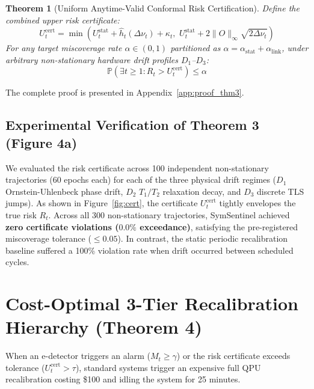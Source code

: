 \documentclass[aps,pra,twocolumn,superscriptaddress,10pt,floatfix]{revtex4-2}
\newtheorem{theorem}{Theorem}
\begin{document}
\begin{theorem}[Uniform Anytime-Valid Conformal Risk Certification]
\label{thm:certify}
Define the combined upper risk certificate:
\begin{equation}
U_t^{\mathrm{cert}} = \min\left( U_t^{\mathrm{stat}} + \hat{h}_t(\Delta \nu_t) + \kappa_t, \,\, U_t^{\mathrm{stat}} + 2 \|O\|_\infty \sqrt{2 \Delta \nu_t} \right)
\label{eq:combined_cert}
\end{equation}
For any target miscoverage rate $\alpha \in (0, 1)$ partitioned as $\alpha = \alpha_{\mathrm{stat}} + \alpha_{\mathrm{link}}$, under arbitrary non-stationary hardware drift profiles $D_1$--$D_3$:
\begin{equation}
\mathbb{P}\left( \exists t \ge 1 : R_t > U_t^{\mathrm{cert}} \right) \le \alpha
\end{equation}
\end{theorem}
The complete proof is presented in Appendix~\ref{app:proof_thm3}.

\subsection{Experimental Verification of Theorem 3 (Figure 4a)}
We evaluated the risk certificate across 100 independent non-stationary trajectories (60 epochs each) for each of the three physical drift regimes ($D_1$ Ornstein-Uhlenbeck phase drift, $D_2$ $T_1/T_2$ relaxation decay, and $D_3$ discrete TLS jumps). As shown in Figure~\ref{fig:cert}, the certificate $U_t^{\mathrm{cert}}$ tightly envelopes the true risk $R_t$. Across all 300 non-stationary trajectories, SymSentinel achieved \textbf{zero certificate violations ($0.0\%$ exceedance)}, satisfying the pre-registered miscoverage tolerance ($\le 0.05$). In contrast, the static periodic recalibration baseline suffered a 100\% violation rate when drift occurred between scheduled cycles.

\section{Cost-Optimal 3-Tier Recalibration Hierarchy (Theorem 4)}
\label{sec:control}
When an e-detector triggers an alarm ($M_t \ge \gamma$) or the risk certificate exceeds tolerance ($U_t^{\mathrm{cert}} > \tau$), standard systems trigger an expensive full QPU recalibration costing \$100 and idling the system for 25 minutes.
\end{document}
